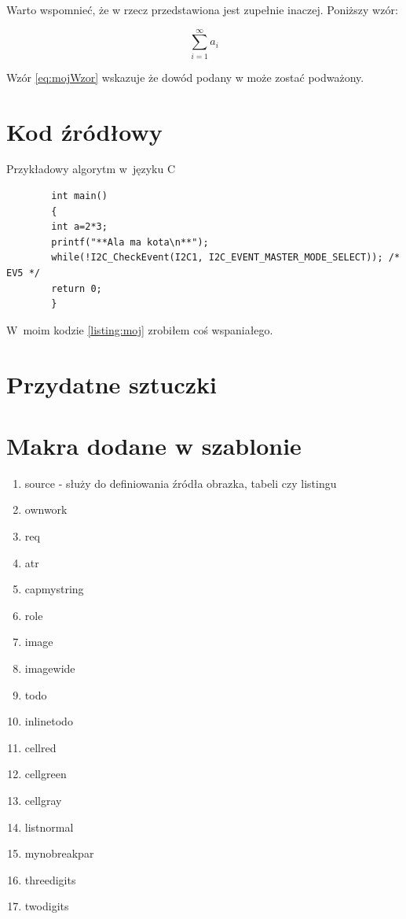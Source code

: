 \lipsum[19-20] Warto wspomnieć, że w rzecz przedstawiona jest zupełnie inaczej. Poniższy wzór:

\begin{equation}
    \sum_{i=1}^{\infty}a_i
    \label{eq:mojWzor}
\end{equation}

Wzór \ref{eq:mojWzor} wskazuje że dowód podany w może zostać podważony. \lipsum[9]

\section{Kod źródłowy}

\begin{listing}[h!]
    \caption{Przykładowy algorytm w~języku C} \label{listing:moj}
    \begin{verbatim}
        int main()
        {
        int a=2*3;
        printf("**Ala ma kota\n**");
        while(!I2C_CheckEvent(I2C1, I2C_EVENT_MASTER_MODE_SELECT)); /* EV5 */
        return 0;
        }
    \end{verbatim}
    \raggedright\source{\ownwork}
\end{listing}

W~moim kodzie \ref{listing:moj} zrobiłem coś wspaniałego. \lipsum[4]

\section{Przydatne sztuczki}
\section{Makra dodane w szablonie}
\begin{enumerate}
    \item source - służy do definiowania źródła obrazka, tabeli czy listingu


    \item ownwork
    \item req
    \item atr
    \item capmystring
    \item role
    \item image
    \item imagewide
    \item todo
    \item inlinetodo
    \item cellred
    \item cellgreen
    \item cellgray
    \item listnormal
    \item mynobreakpar
    \item threedigits
    \item twodigits

\end{enumerate}


